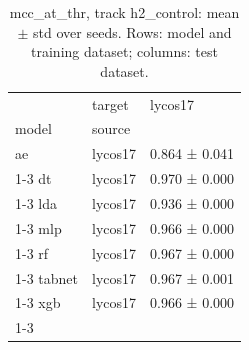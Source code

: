 \begin{table}
\caption{mcc_at_thr, track h2_control: mean $\pm$ std over seeds. Rows: model and training dataset; columns: test dataset.}
\label{tab:matrix_h2_control_mcc_at_thr}
\begin{tabular}{lll}
\toprule
 & target & lycos17 \\
model & source &  \\
\midrule
ae & lycos17 & 0.864 ± 0.041 \\
\cline{1-3}
dt & lycos17 & 0.970 ± 0.000 \\
\cline{1-3}
lda & lycos17 & 0.936 ± 0.000 \\
\cline{1-3}
mlp & lycos17 & 0.966 ± 0.000 \\
\cline{1-3}
rf & lycos17 & 0.967 ± 0.000 \\
\cline{1-3}
tabnet & lycos17 & 0.967 ± 0.001 \\
\cline{1-3}
xgb & lycos17 & 0.966 ± 0.000 \\
\cline{1-3}
\bottomrule
\end{tabular}
\end{table}
